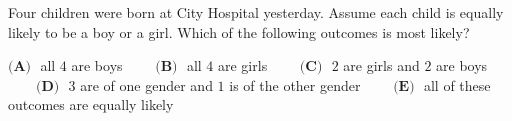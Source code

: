 Four children were born at City Hospital yesterday. Assume each child is equally likely to be a boy or a girl. Which of the following outcomes is most likely?

$\textbf{(A) }$ all $4$ are boys $\qquad\textbf{(B) }$ all $4$ are girls $\qquad\textbf{(C) }$ $2$ are girls and $2$ are boys $\qquad\textbf{(D) }$ $3$ are of one gender and $1$ is of the other gender $\qquad\textbf{(E) }$ all of these outcomes are equally likely

